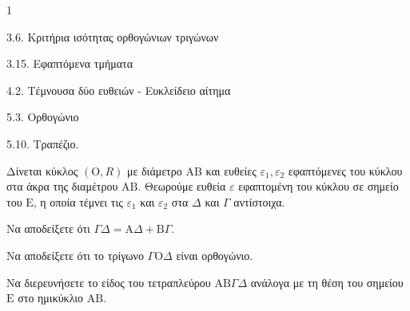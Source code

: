 \begin{ylh}{1}
    \item 3.6. Κριτήρια ισότητας ορθογώνιων τριγώνων
    \item 3.15. Εφαπτόμενα τμήματα
    \item 4.2. Τέμνουσα δύο ευθειών - Ευκλείδειο αίτημα
    \item 5.3. Ορθογώνιο
    \item 5.10. Τραπέζιο.
\end{ylh}
Δίνεται κύκλος $(\mathrm{O}, R)$ με διάμετρο $\mathrm{A}\mathrm{B}$ και ευθείες $\varepsilon_1, \varepsilon_2$ εφαπτόμενες του κύκλου στα άκρα της διαμέτρου $\mathrm{A}\mathrm{B}$. Θεωρούμε ευθεία $\varepsilon$ εφαπτομένη του κύκλου σε σημείο του $\mathrm{E}$, η οποία τέμνει τις $\varepsilon_1$ και $\varepsilon_2$ στα $\Delta$ και $\Gamma$ αντίστοιχα.
\begin{alist}
    \item Να αποδείξετε ότι $\Gamma\Delta = \mathrm{A}\Delta + \mathrm{B}\Gamma$. 
    \item Να αποδείξετε ότι το τρίγωνο $\Gamma\mathrm{O}\Delta$ είναι ορθογώνιο. 
    \item Να διερευνήσετε το είδος του τετραπλεύρου $\mathrm{A}\mathrm{B}\Gamma\Delta$ ανάλογα με τη θέση του σημείου $\mathrm{E}$ στο ημικύκλιο $\mathrm{A}\mathrm{B}$. 
\end{alist}
